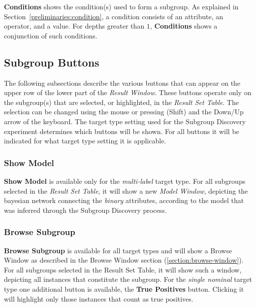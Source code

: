 \documentclass{article}
\begin{document}
\textbf{Conditions} shows the condition(s) used to form a subgroup.
As explained in Section~\ref{preliminaries:condition}, a condition consists of an attribute, an operator, and a value.
For depths greater than $1$, \textbf{Conditions} shows a conjunction of such conditions.



\subsection{Subgroup Buttons}
\label{result-window:subgroup-buttons}
The following subsections describe the various buttons that can appear on the upper row of the lower part of the \emph{Result Window}.
These buttons operate only on the subgroup(s) that are selected, or highlighted, in the \emph{Result Set Table}.
The selection can be changed using the mouse or pressing (Shift) and the Down/Up arrow of the keyboard.
The target type setting used for the Subgroup Discovery experiment determines which buttons will be shown.
For all buttons it will be indicated for what target type setting it is applicable.



\subsubsection{Show Model}
\label{result-window:model}
\textbf{Show Model} is available only for the \emph{multi-label} target type.
For all subgroups selected in the \emph{Result Set Table}, it will show a new \emph{Model Window}, depicting the bayesian network connecting the \emph{binary} attributes, according to the model that was inferred through the Subgroup Discovery process.



\subsubsection{Browse Subgroup}
\label{result-window:browse}
\textbf{Browse Subgroup} is available for all target types and will show a Browse Window as described in the Browse Window section (\ref{section:browse-window}).
For all subgroups selected in the Result Set Table, it will show such a window, depicting all instances that constitute the subgroup.
For the \emph{single nominal} target type one additional button is available, the \textbf{True Positives} button.
Clicking it will highlight only those instances that count as true positives.
\end{document}
